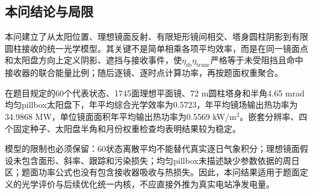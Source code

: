 \subsection{本问结论与局限}

本问建立了从太阳位置、理想镜面反射、有限矩形镜间相交、塔身圆柱阴影到有限圆柱接收的统一光学模型。其关键不是简单相乘各项平均效率，而是在同一镜面点和太阳盘方向上定义阴影、遮挡与接收事件，使$\eta_{\mathrm{sb}}\eta_{\mathrm{trunc}}$严格等于未受阻挡且命中接收器的联合能量比例；随后逐镜、逐时点计算功率，再按题面权重聚合。

在题目规定的60个代表状态、1745面理想平面镜、72 m圆柱塔身和半角4.65 mrad均匀pillbox太阳盘下，年平均综合光学效率为0.5723，年平均镜场输出热功率为34.9868 MW，单位镜面面积年平均输出热功率为0.5569 kW/m$^2$。嵌套分辨率、四个固定种子、太阳盘半角和月份权重检查均表明结果较为稳定。

模型的限制也必须保留：60状态离散平均不能替代真实逐日气象积分；理想镜面假设未包含面形、斜率、跟踪和污染损失；均匀pillbox未描述缺少参数依据的周日区；题面功率公式也没有包含接收器吸收与热损失。因此，本问结果适用于题面定义的光学评价与后续优化统一内核，不应直接外推为真实电站净发电量。
